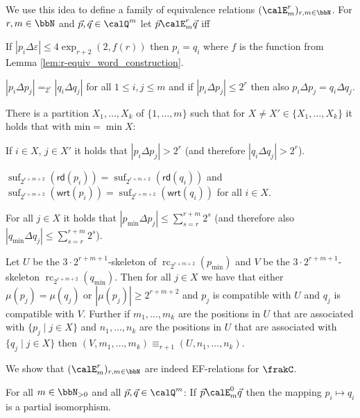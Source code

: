\documentclass[a4paper,numberwithinsect,USenglish]{lipics-v2018}
\theoremstyle{plain}
\theoremstyle{remark}
\DeclareMathOperator{\suf}{suf}
\DeclareMathOperator{\cpr}{rc}
\newcommand{\rd}[1]{\mathsf{rd}(#1)}
\newcommand{\wrt}[1]{\mathsf{wrt}(#1)}
\newcommand{\Qx}{\calQ}
\renewcommand{\epsilon}{\varepsilon}
\begin{document}
We use this idea to  define a family of  equivalence relations $(\calE^r_m)_{r,m\in\bbN}$.
For $r,m\in \bbN$ and $\vec{p},\vec{q}\in \Qx^m$ let $\vec{p} \calE^r_m \vec{q}$ iff
\begin{bracketenumerate}
	\item If $|p_i \Delta \epsilon| \leq 4\exp_{r+2}(2, f(r))$ then $p_i=q_i$ where $f$ is the function from Lemma \ref{lem:r-equiv_word_construction}.
	\item\label{item:E_distance} $|p_i \Delta p_j| =_{2^r} |q_i\Delta q_j|$ for all $1\leq i, j\leq m$ and if $|p_i\Delta p_j| \leq 2^r$ then also $p_i \Delta p_j = q_i\Delta q_j$. 
	\item\label{item:E_partition} There is a partition $X_1,\ldots,X_k$ of $\{1,\ldots,m\}$ such that for $X\neq X'\in \{X_1,\ldots,X_k\}$ it holds that with $\text{min} = \min X$: 
	\begin{alphaenumerate}
		\item\label{item:part_distance} If $i\in X$, $j\in X'$ it holds that $|p_i\Delta p_j| > 2^r$ (and therefore $|q_i\Delta q_j| > 2^r$).
		\item\label{item:E_suffix} $\suf_{2^{r+m+2}}(\rd{p_i}) = \suf_{2^{r+m+2}}(\rd{q_i})$ and \\$\suf_{2^{r+m+2}}(\wrt{p_i}) = \suf_{2^{r+m+2}}(\wrt{q_i})$ for all $i\in X$.
		\item For all $j\in X$ it holds that $|p_\text{min} \Delta p_j| \leq \sum_{s= r}^{r+m} 2^s$ (and therefore also $|q_\text{min} \Delta q_j| \leq \sum_{s= r}^{r+m} 2^s$).
		\item\label{subitem:E_partition:equivalence} Let $U$ be the $3\cdot 2^{r+m+1}$-skeleton of $\cpr_{2^{r+m+2}}(p_\text{min})$ and $V$ be the $3\cdot 2^{r+m+1}$-skeleton $\cpr_{2^{r+m+2}}(q_\text{min})$. Then for all 
		$j\in X$ we have that either $\mu(p_j) = \mu(q_j)$ or $|\mu(p_j)| \geq 2^{r+m+2}$ and $p_j$ is compatible with $U$ and $q_j$ is compatible with $V$. Further if $m_1,\ldots, m_k$ are the positions in $U$ that are associated with $\{p_j \mid j\in X \}$ and $n_1,\ldots, n_k$ are the positions in $U$ that are associated with $\{q_j \mid j\in X \}$ then $(V,m_1,\ldots,m_k) \equiv_{r+1} (U,n_1,\ldots,n_k)$.
	\end{alphaenumerate}  
\end{bracketenumerate} 
We show that $(\calE^r_m)_{r,m\in\bbN}$ are indeed EF-relations for $\frakC$.
\begin{lemma}\label{lem:partial_isomorphism}
	For all $m\in\bbN_{>0}$ and all $\vec{p},\vec{q} \in \Qx^m$: If $\vec{p} \calE^0_m \vec{q}$ then the mapping $p_i \mapsto q_i$ is a partial isomorphism.
\end{lemma}
\end{document}
